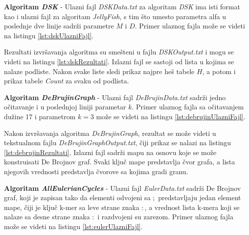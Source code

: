 \documentclass[12pt,oneside]{memoir}
\begin{document}
\textbf{Algoritam \textit{DSK}} - Ulazni fajl \textit{DSKData.txt} za algoritam \textit{DSK} ima isti format kao i ulazni fajl za algoritam \textit{JellyFish}, s tim što umesto parametra alfa u poslednje dve linije sadrži parametre $M$ i $D$. Primer ulaznog fajla može se videti na listingu \ref{lst:dskUlazniFajl}.



Rezultati izvršavanja algoritma su smešteni u fajlu \textit{DSKOutput.txt} i mogu se videti na listingu \ref{lst:dskRezultati}. Izlazni fajl se sastoji od lista u kojima se nalaze podliste. Nakon svake liste sledi prikaz najpre heš tabele $H$, a potom i prikaz tabele \textit{Count} za svaku od podlista.




\textbf{Algoritam \textit{DeBrujinGraph}} - Ulazni fajl \textit{DeBrujinData.txt} sadrži jedno očitavanje i u poslednjoj liniji parametar $k$. Primer ulaznog fajla sa očitavanjem dužine 17 i parametrom $k = 3$ može se videti na listingu \ref{lst:debrujinUlazniFajl}.



Nakon izvršavanja algoritma \textit{DeBrujinGraph}, rezultat se može videti u tekstualnom fajlu \textit{DeBrujinGraphOutput.txt}, čiji prikaz se nalazi na listingu \ref{lst:debrujinRezultati}. Izlazni fajl sadrži mapu na osnovu koje se može konstruisati De Brojnov graf. Svaki ključ mape predstavlja čvor grafa, a lista njegovih vrednosti predstavlja čvorove sa kojima gradi granu.



\textbf{Algoritam \textit{AllEulerianCycles}} - Ulazni fajl \textit{EulerData.txt} sadrži De Brojnov graf, koji je zapisan tako da elementi odvojeni sa $;$ predstavljaju jedan element mape, čiji je ključ k-mer sa leve strane znaka $:$, a vrednost lista k-mera koji se nalaze sa desne strane znaka $:$ i razdvojeni su zarezom. Primer ulaznog fajla može se videti na listingu \ref{lst:eulerUlazniFajl}.
\end{document}
